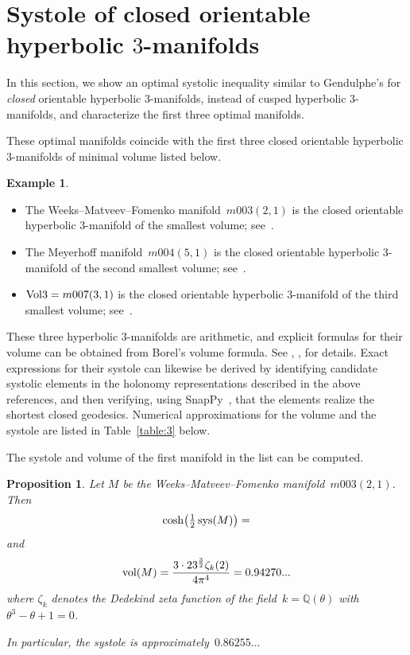 \documentclass[11pt,reqno]{amsart}
\newtheorem{proposition}[theorem]{Proposition}
\theoremstyle{definition}
\newtheorem{example}[theorem]{Example}
\numberwithin{equation}{section}
\newcommand\Q {{\mathbb Q}}
\DeclareMathOperator{\vol}{{\rm vol}}
\DeclareMathOperator{\sys}{{\rm sys}}
\numberwithin{equation}{section}
\begin{document}


\section{Systole of closed orientable hyperbolic \texorpdfstring{$3$}{3}-manifolds}

In this section, we show an optimal systolic inequality similar to Gendulphe's for \emph{closed} orientable hyperbolic $3$-manifolds, instead of cusped hyperbolic $3$-manifolds, and characterize the first three optimal manifolds.

\medskip

These optimal manifolds coincide with the first three closed orientable hyperbolic $3$-manifolds of minimal volume listed below.

\begin{example}
\mbox{ }
\begin{itemize}
\item The Weeks--Matveev--Fomenko manifold~$m003(2,1)$ is the closed orientable hyperbolic $3$-manifold of the smallest volume; see~\cite{GMM}.
\item The Meyerhoff manifold~$m004(5,1)$ is the closed orientable hyperbolic $3$-manifold of the second smallest volume; see~\cite{GHMTY}.
\item ${\rm Vol}3=m007(3,1)$ is the closed orientable hyperbolic $3$-manifold of the third smallest volume; see~\cite{GHMTY}.
\end{itemize}
These three hyperbolic $3$-manifolds are arithmetic, and explicit formulas for their volume can be obtained from Borel's volume formula.
See \cite{CFJR}, \cite{Chinburg}, \cite{JR} for details.
Exact expressions for their systole can likewise be derived by identifying candidate systolic elements in the holonomy representations described in the above references, and then verifying, using SnapPy~\cite{snappy}, that the elements realize the shortest closed geodesics.
Numerical approximations for the volume and the systole are listed in Table~\ref{table:3} below.
\end{example}


\forget

The systole and volume of the first manifold in the list can be computed.

\begin{proposition}
Let $M$ be the Weeks--Matveev--Fomenko manifold~$m003(2,1)$.
Then
\[
\cosh \!\left(\tfrac{1}{2} \sys(M) \right) = 
\]
and 
\[
\vol(M) = \frac{3 \cdot 23^{\frac{3}{2}} \zeta_k(2)}{4 \pi^4} = 0.94270...
\]
where $\zeta_k$ denotes the Dedekind zeta function of the field~$k=\Q(\theta)$ with $\theta^3-\theta+1=0$.

In particular, the systole is approximately~$0.86255...$
\end{proposition}
\end{document}
